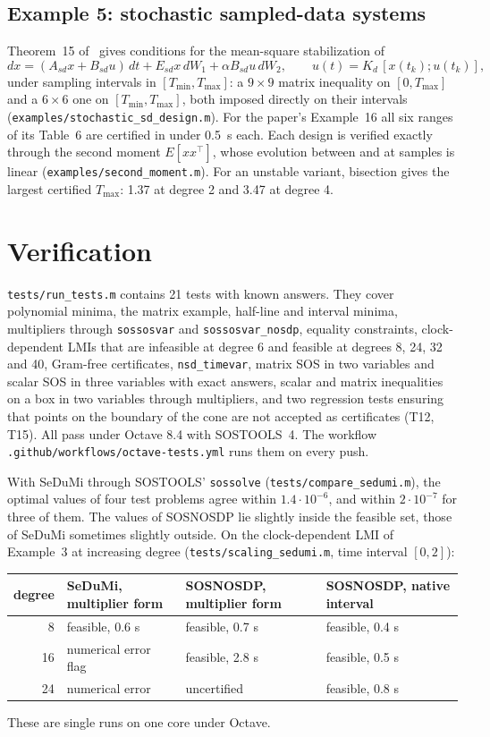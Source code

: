 \documentclass[11pt,a4paper]{article}
\newcommand{\code}[1]{\texttt{#1}}
\begin{document}
\subsection{Example 5: stochastic sampled-data systems}
Theorem~15 of~\cite{Briat2016} gives conditions for the mean-square stabilization of
\[
dx=(A_{sd}x+B_{sd}u)\,dt+E_{sd}x\,dW_1+\alpha B_{sd}u\,dW_2,\qquad u(t)=K_d\,[x(t_k);u(t_k)],
\]
under sampling intervals in $[T_{\min},T_{\max}]$: a $9\times9$ matrix inequality on $[0,T_{\max}]$ and a $6\times6$ one on $[T_{\min},T_{\max}]$, both imposed directly on their intervals (\code{examples/stochastic\_sd\_design.m}). For the paper's Example~16 all six ranges of its Table~6 are certified in under 0.5~s each. Each design is verified exactly through the second moment $E[xx^\top]$, whose evolution between and at samples is linear (\code{examples/second\_moment.m}). For an unstable variant, bisection gives the largest certified $T_{\max}$: 1.37 at degree 2 and 3.47 at degree 4.

\section{Verification}\label{sec:verif}
\code{tests/run\_tests.m} contains 21 tests with known answers. They cover polynomial minima, the matrix example, half-line and interval minima, multipliers through \code{sossosvar} and \code{sossosvar\_nosdp}, equality constraints, clock-dependent LMIs that are infeasible at degree 6 and feasible at degrees 8, 24, 32 and 40, Gram-free certificates, \code{nsd\_timevar}, matrix SOS in two variables and scalar SOS in three variables with exact answers, scalar and matrix inequalities on a box in two variables through multipliers, and two regression tests ensuring that points on the boundary of the cone are not accepted as certificates (T12, T15). All pass under Octave 8.4 with SOSTOOLS~4. The workflow \code{.github/workflows/octave-tests.yml} runs them on every push.

With SeDuMi through SOSTOOLS' \code{sossolve} (\code{tests/compare\_sedumi.m}), the optimal values of four test problems agree within $1.4\cdot10^{-6}$, and within $2\cdot10^{-7}$ for three of them. The values of SOSNOSDP lie slightly inside the feasible set, those of SeDuMi sometimes slightly outside. On the clock-dependent LMI of Example~3 at increasing degree (\code{tests/scaling\_sedumi.m}, time interval $[0,2]$):
\begin{center}\small
\begin{tabular}{rlll}
\toprule
degree & SeDuMi, multiplier form & SOSNOSDP, multiplier form & SOSNOSDP, native interval\\
\midrule
8 & feasible, 0.6 s & feasible, 0.7 s & feasible, 0.4 s\\
16 & numerical error flag & feasible, 2.8 s & feasible, 0.5 s\\
24 & numerical error & uncertified & feasible, 0.8 s\\
\bottomrule
\end{tabular}
\end{center}
These are single runs on one core under Octave.
\end{document}
